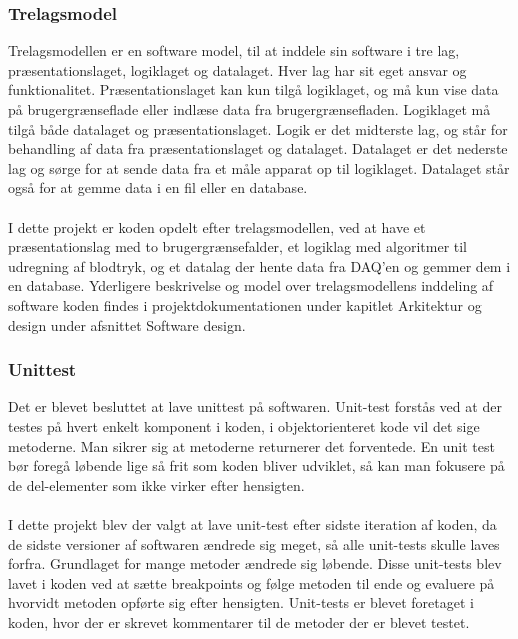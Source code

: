 \subsubsection{Trelagsmodel}
Trelagsmodellen er en software model, til at inddele sin software i tre lag, præsentationslaget, logiklaget og datalaget. Hver lag har sit eget ansvar og funktionalitet. Præsentationslaget kan kun tilgå logiklaget, og må kun vise data på brugergrænseflade eller indlæse data fra brugergrænsefladen. Logiklaget må tilgå både datalaget og præsentationslaget. Logik er det midterste lag, og står for behandling af data fra præsentationslaget og datalaget. Datalaget er det nederste lag og sørge for at sende data fra et måle apparat op til logiklaget. Datalaget står også for at gemme data i en fil eller en database.\\
\\ 
I dette projekt er koden opdelt efter trelagsmodellen, ved at have et præsentationslag med to brugergrænsefalder, et logiklag med algoritmer til udregning af blodtryk, og et datalag der hente data fra DAQ’en og gemmer dem i en database.  Yderligere beskrivelse og model over trelagsmodellens inddeling af software koden findes i projektdokumentationen under kapitlet Arkitektur og design under afsnittet Software design. 
\subsubsection{Unittest}
Det er blevet besluttet at lave unittest på softwaren. Unit-test forstås ved at der testes på hvert enkelt komponent i koden, i objektorienteret kode vil det sige metoderne. Man sikrer sig at metoderne returnerer det forventede. En unit test bør foregå løbende lige så frit som koden bliver udviklet, så kan man fokusere på de del-elementer som ikke virker efter hensigten. \\
\\
I dette projekt blev der valgt at lave unit-test efter sidste iteration af koden, da de sidste versioner af softwaren ændrede sig meget, så alle unit-tests skulle laves forfra. Grundlaget for mange metoder ændrede sig løbende. Disse unit-tests blev lavet i koden ved at sætte breakpoints og følge metoden til ende og evaluere på hvorvidt metoden opførte sig efter hensigten. Unit-tests er blevet foretaget i koden, hvor der er skrevet kommentarer til de metoder der er blevet testet.

